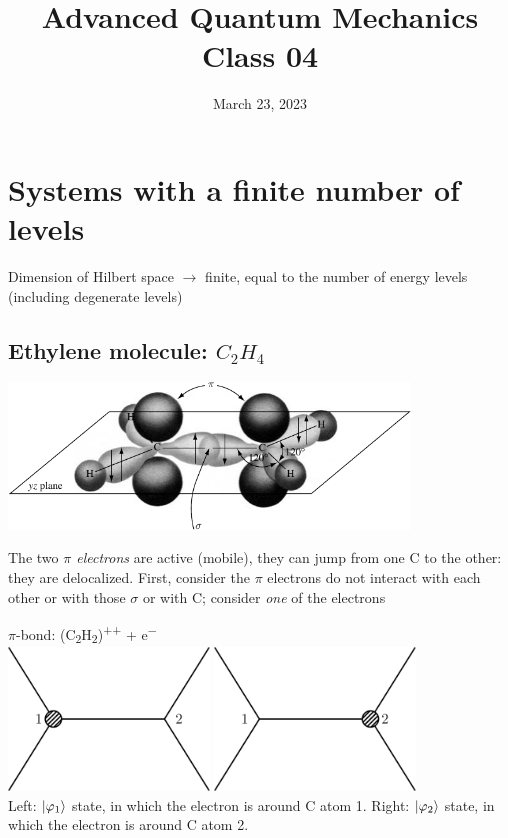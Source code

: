 \documentclass[12pt]{article}
\title{Advanced Quantum Mechanics\\Class 04}
\date{March 23, 2023}                                           %
\begin{document}
\maketitle

\setcounter{section}{1}

\section{Systems with a finite number of levels}


Dimension of Hilbert space \(\rightarrow\) finite, equal to
the number of energy levels (including degenerate
levels)

\subsection{Ethylene molecule: $C_2H_4$}

\begin{center}
\includegraphics[width=0.8\textwidth]{Figures/ethylene.pdf}
\end{center}

The two \emph{$\pi$ electrons} are active (mobile), they can
jump from one C to the other: they are delocalized.
First, consider the $\pi$ electrons do not interact with each
other or with those $\sigma$ or with C; consider \emph{one} of the electrons

\begin{center}
$\pi$-bond: (C\textsubscript{2}H\textsubscript{2})\textsuperscript{++} + e\textsuperscript{$-$}\\[2ex]
\quad
\includegraphics[width=0.4\textwidth]{Figures/electronAroundCAtom1.pdf}\hfill
\includegraphics[width=0.4\textwidth]{Figures/electronAroundCAtom2.pdf}
\quad\\
Left: $\ket{\varphi_1}$ state, in which the electron is around C atom 1.
Right: $\ket{\varphi_2}$ state, in which the electron is around C atom 2.
\end{center}
\end{document}
